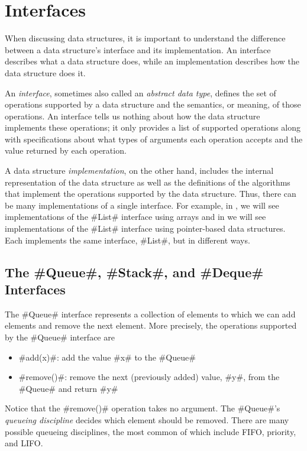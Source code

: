 \section{Interfaces}
When discussing data structures, it is important to understand the difference between a data structure's interface and its implementation.  An interface describes what a data structure does, while an implementation describes how the data structure does it.

An \emph{interface},   sometimes also called an \emph{abstract data type}, defines the set of operations supported by a data structure and the semantics, or meaning, of those operations.  An interface tells us nothing about how the data structure implements these operations; it only provides a list of supported operations along with specifications about what types of arguments each operation accepts and the value returned by each operation.

A data structure \emph{implementation}, on the other hand, includes the internal representation of the data structure as well as the definitions of the algorithms that implement the operations supported by the data structure.  Thus, there can be many implementations of a single interface.  For example, in , we will see implementations of the #List# interface using arrays and in  we will see implementations of the #List# interface using pointer-based data structures.  Each implements the same interface, #List#, but in different ways.

\subsection{The #Queue#, #Stack#, and #Deque# Interfaces}

The #Queue# interface represents a collection of elements to which we can add elements and remove the next element.  More precisely, the operations supported by the #Queue# interface are
\begin{itemize}
  \item #add(x)#: add the value #x# to the #Queue#
  \item #remove()#: remove the next (previously added) value, #y#, from the #Queue# and return #y#
\end{itemize}
Notice that the #remove()# operation takes no argument.  The #Queue#'s \emph{queueing discipline} decides which element should be removed.  There are many possible queueing disciplines, the most common of which include FIFO, priority, and LIFO.

